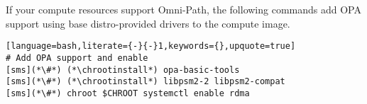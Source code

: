 If your compute resources support Omni-Path, the following commands add OPA
support using base distro-provided drivers to the compute image. 

\begin{lstlisting}[language=bash,literate={-}{-}1,keywords={},upquote=true]
# Add OPA support and enable
[sms](*\#*) (*\chrootinstall*) opa-basic-tools
[sms](*\#*) (*\chrootinstall*) libpsm2-2 libpsm2-compat
[sms](*\#*) chroot $CHROOT systemctl enable rdma
\end{lstlisting}
